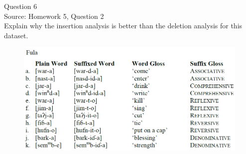\documentclass[12pt]{article}
\begin{document}
\newpage

{\large Question 6}\\

Source: Homework 5, Question 2\\

Explain why the insertion analysis is better than the deletion analysis for this dataset.\\

\begin{figure}[H]
\includegraphics{../images/fula.png}
\end{figure}

\newpage

\begin{center}
\textbf{{\color{red}{\HUGE END OF EXAM}}}\\

\end{center}
\newpage
\end{document}
